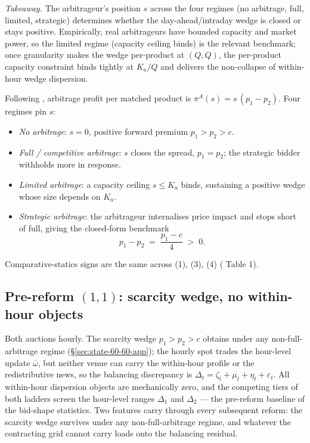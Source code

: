 \documentclass[11pt,a4paper]{article}
\theoremstyle{definition}
\theoremstyle{remark}
\theoremstyle{plain}
\begin{document}
\emph{Takeaway.} The arbitrageur's position $s$ across the four \citeauthor{ito_reguant_2016} regimes (no arbitrage, full, limited, strategic) determines whether the day-ahead/intraday wedge is closed or stays positive. Empirically, real arbitrageurs have bounded capacity and market power, so the limited regime (capacity ceiling binds) is the relevant benchmark; once granularity makes the wedge per-product at $(Q,Q)$, the per-product capacity constraint binds tightly at $K_a/Q$ and delivers the non-collapse of within-hour wedge dispersion.

Following \citet[\S I.A and Table 1]{ito_reguant_2016}, arbitrage profit per matched product is $\pi^A(s) = s\,(p_1 - p_2)$. Four regimes pin $s$:
\begin{itemize}
\item[(1)] \emph{No arbitrage}: $s = 0$, positive forward premium $p_1 > p_2 > c$.
\item[(2)] \emph{Full / competitive arbitrage}: $s$ closes the spread, $p_1 = p_2$; the strategic bidder withholds more in response.
\item[(3)] \emph{Limited arbitrage}: a capacity ceiling $s \le K_a$ binds, sustaining a positive wedge whose size depends on $K_a$.
\item[(4)] \emph{Strategic arbitrage}: the arbitrageur internalises price impact and stops short of full, giving the closed-form benchmark
\begin{equation}
\boxed{\;p_1 - p_2 \;=\; \frac{p_1 - c}{4} \;>\; 0.\;}
\label{eq:strategic-arb}
\end{equation}
\end{itemize}
Comparative-statics signs are the same across (1), (3), (4) (\citeauthor{ito_reguant_2016} Table 1).

\subsection{Pre-reform $(1,1)$: scarcity wedge, no within-hour objects}\label{sec:pre}

Both auctions hourly. The \citeauthor{ito_reguant_2016} scarcity wedge $p_1 > p_2 > c$ obtains under any non-full-arbitrage regime (\S\ref{sec:state-60-60-app}); the hourly spot trades the hour-level update $\bar\omega$, but neither venue can carry the within-hour profile or the redistributive news, so the balancing discrepancy is $\Delta_t = \zeta_t + \mu_t + \eta_t + \varepsilon_t$. All within-hour dispersion objects are mechanically zero, and the competing tiers of both ladders screen the hour-level ranges $\Delta_1$ and $\Delta_2$ --- the pre-reform baseline of the bid-shape statistics. Two features carry through every subsequent reform: the scarcity wedge survives under any non-full-arbitrage regime, and whatever the contracting grid cannot carry loads onto the balancing residual.
\end{document}
